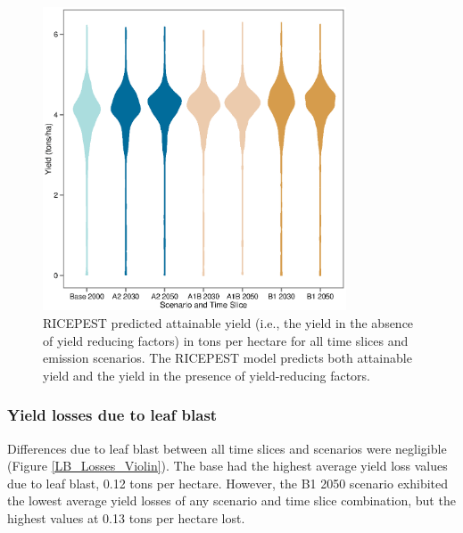 \documentclass[preprint,12pt]{elsarticle}
\begin{document}
\begin{figure}[H]
  \includegraphics[width = 90mm]{figures/Yield_Attainable_Violin}
  \caption{RICEPEST predicted attainable yield (i.e., the yield in the absence of yield reducing factors) in tons per hectare for all time slices and emission scenarios. The RICEPEST model predicts both attainable yield and the yield in the presence of yield-reducing factors.}
  \label{Yield_Attainable_Violin}
\end{figure}

\subsubsection{Yield losses due to leaf blast}
Differences due to leaf blast between all time slices and scenarios were negligible (Figure \ref{LB_Losses_Violin}). The base had the highest average yield loss values due to leaf blast, 0.12 tons per hectare. However, the B1 2050 scenario exhibited the lowest average yield losses of any scenario and time slice combination, but the highest values at 0.13 tons per hectare lost.
\end{document}

